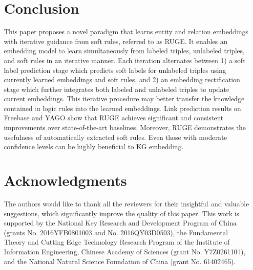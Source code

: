 \documentclass[letterpaper]{article} \usepackage{aaai18}  \usepackage{times}  \usepackage{helvet}  \usepackage{courier}  \usepackage{url}  \usepackage{graphicx}  \usepackage{amsmath}
\begin{document}
\section{Conclusion}
This paper proposes a novel paradigm that learns entity and relation embeddings with iterative guidance from soft rules, referred to as RUGE. It enables an embedding model to learn simultaneously from labeled triples, unlabeled triples, and soft rules in an iterative manner. Each iteration alternates between 1) a soft label prediction stage which predicts soft labels for unlabeled triples using currently learned embeddings and soft rules, and 2) an embedding rectification stage which further integrates both labeled and unlabeled triples to update current embeddings. This iterative procedure may better transfer the knowledge contained in logic rules into the learned embeddings. Link prediction results on Freebase and YAGO show that RUGE achieves significant and consistent improvements over state-of-the-art baselines. Moreover, RUGE demonstrates the usefulness of automatically extracted soft rules. Even those with moderate confidence levels can be highly beneficial to KG embedding.

\section*{Acknowledgments}
The authors would like to thank all the reviewers for their insightful and valuable suggestions, which significantly improve the quality of this paper. This work is supported by the National Key Research and Development Program of China (grants No. 2016YFB0801003 and No. 2016QY03D0503), the Fundamental Theory and Cutting Edge Technology Research Program of the Institute of Information Engineering, Chinese Academy of Sciences (grant No. Y7Z0261101), and the National Natural Science Foundation of China (grant No. 61402465).
\end{document}
